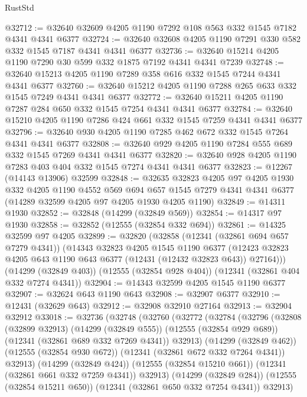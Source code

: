 \begin{lexlean}{RustStd}
\begin{coremodule}
@32712 := @32640 @32609 @4205 @1190 @7292 @108 @563 @332 @1545 @7182 @4341 @4341 @6377
@32724 := @32640 @32608 @4205 @1190 @7291 @330 @582 @332 @1545 @7187 @4341 @4341 @6377
@32736 := @32640 @15214 @4205 @1190 @7290 @30 @599 @332 @1875 @7192 @4341 @4341 @7239
@32748 := @32640 @15213 @4205 @1190 @7289 @358 @616 @332 @1545 @7244 @4341 @4341 @6377
@32760 := @32640 @15212 @4205 @1190 @7288 @265 @633 @332 @1545 @7249 @4341 @4341 @6377
@32772 := @32640 @15211 @4205 @1190 @7287 @284 @650 @332 @1545 @7254 @4341 @4341 @6377
@32784 := @32640 @15210 @4205 @1190 @7286 @424 @661 @332 @1545 @7259 @4341 @4341 @6377
@32796 := @32640 @930 @4205 @1190 @7285 @462 @672 @332 @1545 @7264 @4341 @4341 @6377
@32808 := @32640 @929 @4205 @1190 @7284 @555 @689 @332 @1545 @7269 @4341 @4341 @6377
@32820 := @32640 @928 @4205 @1190 @7283 @403 @404 @332 @1545 @7274 @4341 @4341 @6377
@32823 := @12267 (@14143 @13906) @32599
@32848 := @32635
    @32823
    @4205
    @97
    @4205
    @1930
    @332
    @4205
    @1190
    @4552
    @569
    @694
    @657
    @1545
    @7279
    @4341
    @4341
    @6377
    (@14289 @32599 @4205 @97 @4205 @1930 @4205 @1190)
@32849 := @14311 @1930
@32852 := @32848 (@14299 (@32849 @569))
@32854 := @14317 @97 @1930
@32858 := @32852 (@12555 (@32854 @332 @694))
@32861 := @14325 @32599 @97 @4205
@32899 := @32820
    (@32858
      (@12341 (@32861 @694 @657 @7279 @4341))
      (@14343
        @32823
        @4205
        @1545
        @1190
        @6377
        (@12423 @32823 @4205 @643 @1190 @643 @6377 (@12431 (@12432 @32823 @643)) @27164)))
    (@14299 (@32849 @403))
    (@12555 (@32854 @928 @404))
    (@12341 (@32861 @404 @332 @7274 @4341))
@32904 := @14343 @32599 @4205 @1545 @1190 @6377
@32907 := @32624 @643 @1190 @643
@32908 := @32907 @6377
@32910 := @12431 (@32629 @643)
@32912 := @32908 @32910 @27164
@32913 := @32904 @32912
@33018 := @32736
    (@32748
      (@32760
        (@32772
          (@32784
            (@32796
              (@32808
                (@32899 @32913)
                (@14299 (@32849 @555))
                (@12555 (@32854 @929 @689))
                (@12341 (@32861 @689 @332 @7269 @4341))
                @32913)
              (@14299 (@32849 @462))
              (@12555 (@32854 @930 @672))
              (@12341 (@32861 @672 @332 @7264 @4341))
              @32913)
            (@14299 (@32849 @424))
            (@12555 (@32854 @15210 @661))
            (@12341 (@32861 @661 @332 @7259 @4341))
            @32913)
          (@14299 (@32849 @284))
          (@12555 (@32854 @15211 @650))
          (@12341 (@32861 @650 @332 @7254 @4341))
          @32913)

\end{coremodule}
\end{lexlean}
